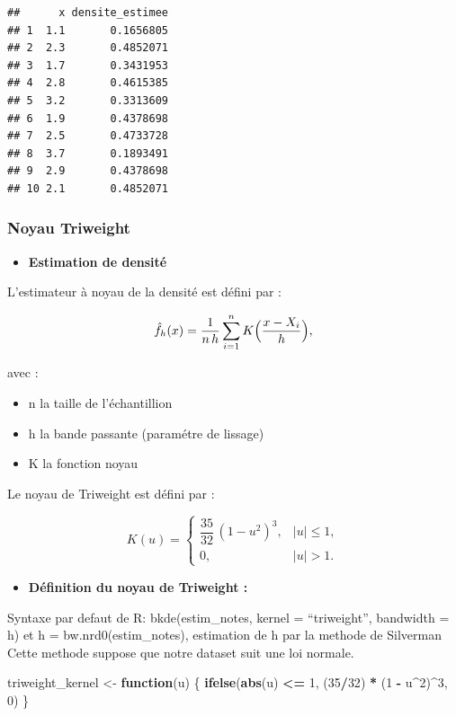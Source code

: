 \documentclass[
  12pt,
]{article}
\newenvironment{Shaded}{\begin{snugshade}}{\end{snugshade}}
\newcommand{\ControlFlowTok}[1]{\textcolor[rgb]{0.13,0.29,0.53}{\textbf{#1}}}
\newcommand{\DecValTok}[1]{\textcolor[rgb]{0.00,0.00,0.81}{#1}}
\newcommand{\FunctionTok}[1]{\textcolor[rgb]{0.13,0.29,0.53}{\textbf{#1}}}
\newcommand{\NormalTok}[1]{#1}
\newcommand{\OtherTok}[1]{\textcolor[rgb]{0.56,0.35,0.01}{#1}}
\newcommand{\SpecialCharTok}[1]{\textcolor[rgb]{0.81,0.36,0.00}{\textbf{#1}}}
\providecommand{\tightlist}{%
  \setlength{\itemsep}{0pt}\setlength{\parskip}{0pt}}
\begin{document}
\begin{verbatim}
##      x densite_estimee
## 1  1.1       0.1656805
## 2  2.3       0.4852071
## 3  1.7       0.3431953
## 4  2.8       0.4615385
## 5  3.2       0.3313609
## 6  1.9       0.4378698
## 7  2.5       0.4733728
## 8  3.7       0.1893491
## 9  2.9       0.4378698
## 10 2.1       0.4852071
\end{verbatim}

\subsubsection{Noyau Triweight}\label{noyau-triweight}

\begin{itemize}
\tightlist
\item
  \textbf{Estimation de densité}
\end{itemize}

L'estimateur à noyau de la densité est défini par :

\[\hat f_h(x) = \frac{1}{n\,h} \sum_{i=1}^n K\Bigl(\frac{x - X_i}{h}\Bigr),\]

avec :

\begin{itemize}
\item
  n la taille de l'échantillion
\item
  h la bande passante (paramétre de lissage)
\item
  K la fonction noyau
\end{itemize}

Le noyau de Triweight est défini par :

\[
K(u) = 
\begin{cases}
  \dfrac{35}{32}\,(1 - u^2)^3, & |u| \le 1, \\
  0, & |u| > 1.
\end{cases}
\]

\begin{itemize}
\tightlist
\item
  \textbf{Définition du noyau de Triweight : }
\end{itemize}

Syntaxe par defaut de R: bkde(estim\_notes, kernel = ``triweight'',
bandwidth = h) et h = bw.nrd0(estim\_notes), estimation de h par la
methode de Silverman Cette methode suppose que notre dataset suit une
loi normale.

\begin{Shaded}
\begin{Highlighting}[]
\NormalTok{triweight\_kernel }\OtherTok{\textless{}{-}} \ControlFlowTok{function}\NormalTok{(u) \{}
  \FunctionTok{ifelse}\NormalTok{(}\FunctionTok{abs}\NormalTok{(u) }\SpecialCharTok{\textless{}=} \DecValTok{1}\NormalTok{, (}\DecValTok{35}\SpecialCharTok{/}\DecValTok{32}\NormalTok{) }\SpecialCharTok{*}\NormalTok{ (}\DecValTok{1} \SpecialCharTok{{-}}\NormalTok{ u}\SpecialCharTok{\^{}}\DecValTok{2}\NormalTok{)}\SpecialCharTok{\^{}}\DecValTok{3}\NormalTok{, }\DecValTok{0}\NormalTok{)}
\NormalTok{\}}
\end{Highlighting}
\end{Shaded}
\end{document}
